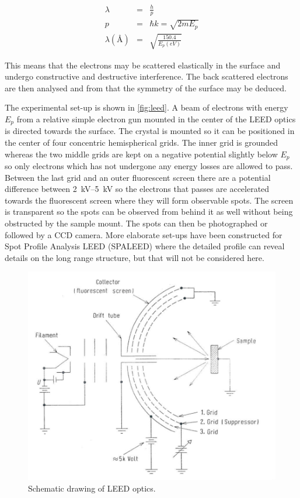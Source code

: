 \begin{eqnarray}
\lambda	& =	& \frac{h}{p}\\
p	& =	& \hbar k=\sqrt{2mE_p}\\
\lambda(\si{\angstrom})	& =	& \sqrt{\frac{150.4}{E_p(\si{eV})}}
\end{eqnarray}

This means that the electrons may be scattered elastically  in the surface and undergo constructive and destructive interference. The back scattered electrons are then analysed and from that the symmetry of the surface may be deduced.

The experimental set-up is shown in \autoref{fig:leed}.  A beam of electrons with energy $E_p$ from a relative simple electron gun mounted in the center of the LEED optics is directed towards the surface. The crystal is mounted so it can be positioned in the center of four concentric hemispherical grids. The inner grid is grounded whereas the two middle grids are kept on a negative potential slightly below  $E_p$ so only electrons which has not undergone any energy losses are allowed to pass. Between the last grid and an outer fluorescent screen there are a potential difference between \SIrange{2}{5}{kV} so the electrons that passes are accelerated towards the fluorescent screen where they will form observable spots. The screen is  transparent so the spots can be observed from behind it as well without being obstructed by the sample mount. The spots can then be photographed or followed by a CCD camera. More elaborate set-ups have been constructed for Spot Profile Analysis LEED (SPALEED) where the detailed profile can reveal details on the long range structure, but that will not be considered here.

\begin{figure}[h!]
	\begin{center}
	\includegraphics[scale=4]{figures/09_05.png}
	\caption{Schematic drawing of LEED optics.}
	\label{fig:leed}
	\end{center}
\end{figure}

